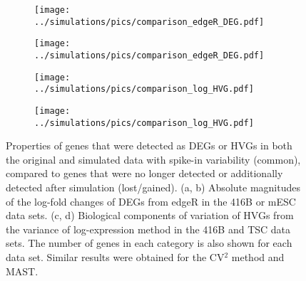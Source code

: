 \documentclass{article}
\begin{document}
\begin{figure}[btp]
    \begin{center}
        \begin{subfigure}{0.24\textwidth}
            \texttt{[image: ../simulations/pics/comparison\_edgeR\_DEG.pdf]}
            \caption{}
        \end{subfigure}
        \begin{subfigure}{0.24\textwidth}
            \texttt{[image: ../simulations/pics/comparison\_edgeR\_DEG.pdf]}
            \caption{}
        \end{subfigure}
        \begin{subfigure}{0.24\textwidth}
            \texttt{[image: ../simulations/pics/comparison\_log\_HVG.pdf]}
            \caption{}
        \end{subfigure}
        \begin{subfigure}{0.24\textwidth}
            \texttt{[image: ../simulations/pics/comparison\_log\_HVG.pdf]}
            \caption{}
        \end{subfigure}
    \end{center}
    \caption{Properties of genes that were detected as DEGs or HVGs in both the original and simulated data with spike-in variability (common), compared to genes that were no longer detected or additionally detected after simulation (lost/gained).
    (a, b) Absolute magnitudes of the log-fold changes of DEGs from edgeR in the 416B or mESC data sets.
    (c, d) Biological components of variation of HVGs from the variance of log-expression method in the 416B and TSC data sets.
    The number of genes in each category is also shown for each data set.
    Similar results were obtained for the CV$^2$ method and MAST.
    }
\end{figure}
\end{document}
